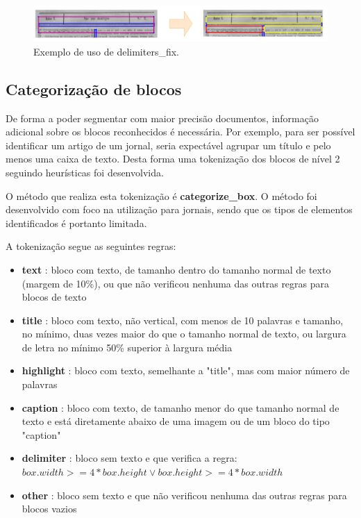 \begin{figure}[H]
	\centering
	\includegraphics[width=1\textwidth]{images/ilustracoes/delimiter_fix.png}
	\caption{Exemplo de uso de delimiters\_fix.}
	\label{fig:delimiter_fix}
\end{figure}



\subsection{Categorização de blocos}
\label{contribution_categorize_blocks}

De forma a poder segmentar com maior precisão documentos, informação adicional sobre os blocos reconhecidos é necessária. Por exemplo, para ser possível identificar um artigo de um jornal, seria expectável agrupar um título e pelo menos uma caixa de texto. Desta forma uma tokenização dos blocos de nível 2 seguindo heurísticas foi desenvolvida.

O método que realiza esta tokenização é \textbf{categorize\_box}. O método foi desenvolvido com foco na utilização para jornais, sendo que os tipos de elementos identificados é portanto limitada.

A tokenização segue as seguintes regras:

\begin{itemize}\setlength\itemsep{-0.3em}
	\vspace{-0.5em}
	\item \textbf{text} 		: bloco com texto, de tamanho dentro do tamanho normal de texto (margem de 10\%), ou que não verificou nenhuma das outras regras para blocos de texto
	\item \textbf{title} 	: bloco com texto, não vertical, com menos de 10 palavras e tamanho, no mínimo, duas vezes maior do que o tamanho normal de texto, ou largura de letra no mínimo 50\% superior à largura média
	\item \textbf{highlight} : bloco com texto, semelhante a "title", mas com maior número de palavras
	\item \textbf{caption} 	: bloco com texto, de tamanho menor do que tamanho normal de texto e está diretamente abaixo de uma imagem ou de um bloco do tipo "caption"
	\item \textbf{delimiter} : bloco sem texto e que verifica a regra: $box.width >= 4*box.height \vee box.height >= 4*box.width$
	\item \textbf{other} 	: bloco sem texto e que não verificou nenhuma das outras regras para blocos vazios
\end{itemize}

